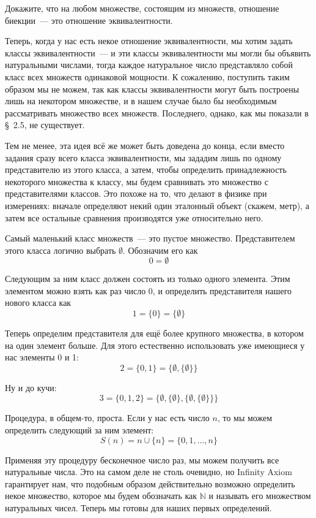 \begin{exercise}
Докажите, что на любом множестве, состоящим из множеств, отношение биекции~--- это отношение эквивалентности.
\end{exercise}

Теперь, когда у нас есть некое отношение эквивалентности, мы хотим задать классы эквивалентности~--- и эти классы эквивалентности мы могли бы объявить натуральными числами, тогда каждое натуральное число представляло собой класс всех множеств одинаковой мощности. К сожалению, поступить таким образом мы не можем, так как классы эквивалентности могут быть построены лишь на некотором множестве, и в нашем случае было бы необходимым рассматривать множество всех множеств. Последнего, однако, как мы показали в \S~2.5, не существует.

Тем не менее, эта идея всё же может быть доведена до конца, если вместо задания сразу всего класса эквивалентности, мы зададим лишь по одному представителю из этого класса, а затем, чтобы определить принадлежность некоторого множества к классу, мы будем сравнивать это множество с представителями классов. Это похоже на то, что делают в физике при измерениях: вначале определяют некий один эталонный объект (скажем, метр), а затем все остальные сравнения производятся уже относительно него.

Самый маленький класс множеств~--- это пустое множество. Представителем этого класса логично выбрать $\emptyset$. Обозначим его как $$0 = \emptyset$$

Следующим за ним класс должен состоять из только одного элемента. Этим элементом можно взять как раз число 0, и определить представителя нашего нового класса как $$1 = \{0\} = \{\emptyset\}$$

Теперь определим представителя для ещё более крупного множества, в котором на один элемент больше. Для этого естественно использовать уже имеющиеся у нас элементы 0 и 1: $$2 = \{0, 1\} = \{\emptyset, \{\emptyset\}\}$$

Ну и до кучи: $$3 = \{0, 1, 2\} = \{\emptyset, \{\emptyset\}, \{\emptyset, \{\emptyset\}\}\}$$

Процедура, в общем-то, проста. Если у нас есть число $n$, то мы можем определить следующий за ним элемент: $$S(n) = n \cup \{n\} = \{0, 1, \ldots, n\}$$

Применяя эту процедуру бесконечное число раз, мы можем получить все натуральные числа. Это на самом деле не столь очевидно, но Infinity Axiom гарантирует нам, что подобным образом действительно возможно определить некое множество, которое мы будем обозначать как $\mathbb{N}$ и называть его множеством натуральных чисел. Теперь мы готовы для наших первых определений.

